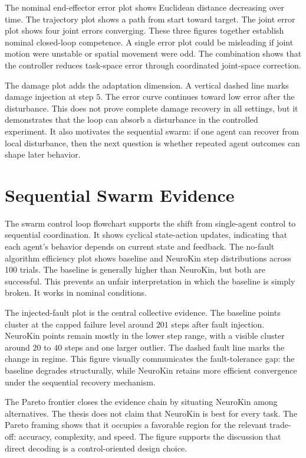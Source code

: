 \documentclass[12pt,a4paper,oneside]{report}
\begin{document}
The nominal end-effector error plot shows Euclidean distance decreasing over time. The trajectory plot shows a path from start toward target. The joint error plot shows four joint errors converging. These three figures together establish nominal closed-loop competence. A single error plot could be misleading if joint motion were unstable or spatial movement were odd. The combination shows that the controller reduces task-space error through coordinated joint-space correction.

The damage plot adds the adaptation dimension. A vertical dashed line marks damage injection at step $5$. The error curve continues toward low error after the disturbance. This does not prove complete damage recovery in all settings, but it demonstrates that the loop can absorb a disturbance in the controlled experiment. It also motivates the sequential swarm: if one agent can recover from local disturbance, then the next question is whether repeated agent outcomes can shape later behavior.

\section{Sequential Swarm Evidence}

The swarm control loop flowchart supports the shift from single-agent control to sequential coordination. It shows cyclical state-action updates, indicating that each agent's behavior depends on current state and feedback. The no-fault algorithm efficiency plot shows baseline and NeuroKin step distributions across 100 trials. The baseline is generally higher than NeuroKin, but both are successful. This prevents an unfair interpretation in which the baseline is simply broken. It works in nominal conditions.

The injected-fault plot is the central collective evidence. The baseline points cluster at the capped failure level around $201$ steps after fault injection. NeuroKin points remain mostly in the lower step range, with a visible cluster around $20$ to $40$ steps and one larger outlier. The dashed fault line marks the change in regime. This figure visually communicates the fault-tolerance gap: the baseline degrades structurally, while NeuroKin retains more efficient convergence under the sequential recovery mechanism.

The Pareto frontier closes the evidence chain by situating NeuroKin among alternatives. The thesis does not claim that NeuroKin is best for every task. The Pareto framing shows that it occupies a favorable region for the relevant trade-off: accuracy, complexity, and speed. The figure supports the discussion that direct decoding is a control-oriented design choice.
\end{document}
